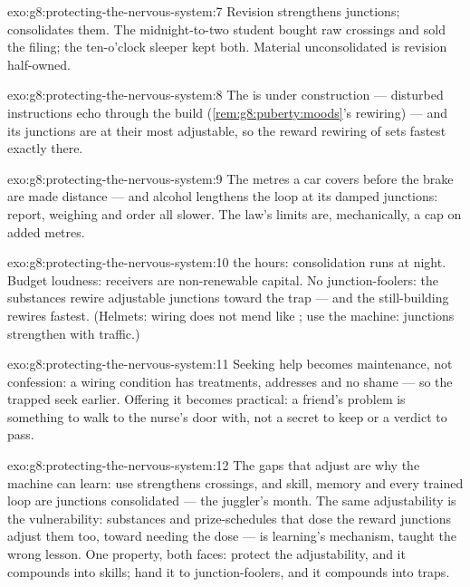 \begin{solution}{exo:g8:protecting-the-nervous-system:7}
Revision strengthens junctions;  consolidates them.
The midnight-to-two student bought raw crossings and sold
the filing; the ten-o'clock sleeper kept both. Material
unconsolidated is revision half-owned.
\end{solution}

\begin{solution}{exo:g8:protecting-the-nervous-system:8}
The   is under construction --- disturbed
instructions echo through the build
(\cref{rem:g8:puberty:moods}'s rewiring) --- and its
junctions are at their most adjustable, so the reward
rewiring of  sets fastest exactly there.
\end{solution}

\begin{solution}{exo:g8:protecting-the-nervous-system:9}
The metres a car covers before the brake are  made distance --- and alcohol lengthens the loop at
its damped junctions: report, weighing and order all
slower. The law's limits are, mechanically, a cap on
added metres.
\end{solution}

\begin{solution}{exo:g8:protecting-the-nervous-system:10}
 the hours: consolidation runs at night. Budget
loudness: receivers are non-renewable capital. No
junction-foolers: the substances rewire adjustable
junctions toward the trap --- and the still-building
 rewires fastest. (Helmets: wiring does not mend
like ; use the machine: junctions strengthen with
traffic.)
\end{solution}

\begin{solution}{exo:g8:protecting-the-nervous-system:11}
Seeking help becomes maintenance, not confession: a
wiring condition has treatments, addresses and no shame
--- so the trapped seek earlier. Offering it becomes
practical: a friend's problem is something to walk to
the nurse's door with, not a secret to keep or a verdict
to pass.
\end{solution}

\begin{solution}{exo:g8:protecting-the-nervous-system:12}
The gaps that adjust are why the machine can learn: use
strengthens crossings, and skill, memory and every
trained loop are junctions consolidated --- the
juggler's month. The same adjustability is the
vulnerability: substances and prize-schedules that dose
the reward junctions adjust them too, toward needing the
dose ---  is learning's mechanism, taught the
wrong lesson. One property, both faces: protect the
adjustability, and it compounds into skills; hand it to
junction-foolers, and it compounds into traps.
\end{solution}

